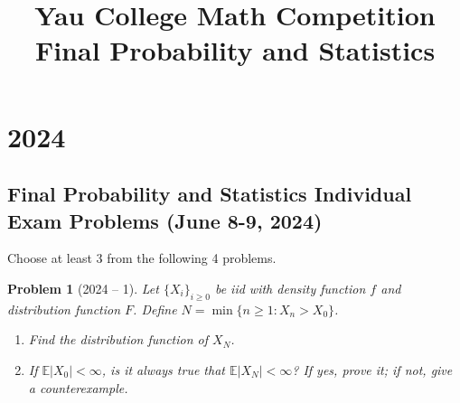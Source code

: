 \documentclass[12pt]{amsart}
\title{Yau College Math Competition \\ Final Probability and Statistics}
\author{}
\date{}
\newtheorem{problem}{Problem}
\begin{document}
\maketitle
\tableofcontents

\section*{2024}
\subsection*{Final Probability and Statistics Individual Exam Problems (June 8-9, 2024)}
Choose at least 3 from the following 4 problems.

\begin{problem}[2024 -- 1]
Let $\{X_i\}_{i \geq 0}$ be iid with density function $f$ and distribution function $F$. Define $N=\min \{n \geq 1: X_n>X_0\}$.
\begin{enumerate}[label=(\alph*)]
\item Find the distribution function of $X_N$.
\item If $\mathbb{E}|X_0|<\infty$, is it always true that $\mathbb{E}|X_N|<\infty$? If yes, prove it; if not, give a counterexample.
\end{enumerate}
\end{problem}
\end{document}
